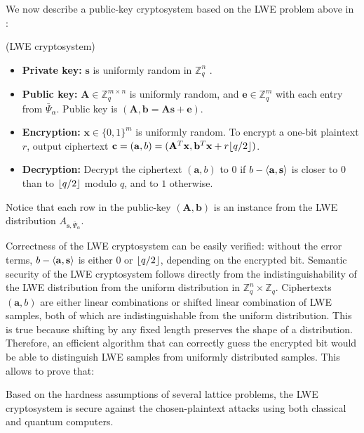 We now describe a public-key cryptosystem based on the LWE problem above in \cite{brakerski2013classical}:
\begin{definition}{(LWE cryptosystem)}
\label{def:LWE_crypto}
\begin{itemize}
\item \textbf{Private key:} $\mathbf{s}$ is uniformly random in $\mathbb{Z}_q^n$ .
\item \textbf{Public key:}  $\mathbf{A}\in \mathbb{Z}_q^{m\times n}$ is uniformly random, and $\mathbf{e}\in \mathbb{Z}_q^m$ with each entry from $\bar{\Psi}_\alpha$. Public key is $(\mathbf{A},\mathbf{b}=\mathbf{A}\mathbf{s}+\mathbf{e})$.
\item \textbf{Encryption:}  $\mathbf{x}\in\{0,1\}^m$ is uniformly random. To encrypt a one-bit plaintext $r$, output ciphertext $\mathbf{c}=(\mathbf{a},b) = (\mathbf{A}^T\mathbf{x},\mathbf{b}^T\mathbf{x}+ r\lfloor q/2\rfloor)$.
\item \textbf{Decryption:} Decrypt the ciphertext $(\mathbf{a},b)$ to $0$ if $b-\langle\mathbf{a},\mathbf{s}\rangle$ is closer to $0$ than to $\lfloor q/2\rfloor$ modulo $q$, and to $1$ otherwise. 
\end{itemize}
\end{definition}
Notice that each row in the public-key $(\mathbf{A},\mathbf{b})$ is an instance from the LWE distribution $A_{\mathbf{s},\bar{\Psi}_\alpha}$.

Correctness of the LWE cryptosystem can be easily verified: without the error terms, $b-\langle\mathbf{a},\mathbf{s}\rangle$ is either $0$ or $\lfloor q/2\rfloor$, depending on the encrypted bit. 
Semantic security of the LWE cryptosystem follows directly from the indistinguishability of the LWE distribution from the uniform distribution in $\mathbb{Z}_q^n\times\mathbb{Z}_q$. 
Ciphertexts $(\mathbf{a},b)$ are either linear combinations or shifted linear combination of LWE samples, both of which are indistinguishable from the uniform distribution. 
This is true because shifting by any fixed length preserves the shape of a distribution.
Therefore, an efficient algorithm that can correctly guess the encrypted bit would be able to distinguish LWE samples from uniformly distributed samples. 
This allows \cite{regev2009lattices} to prove that:
\begin{theorem}
\label{thm:LWE_hardness}
Based on the hardness assumptions of several lattice problems, the LWE cryptosystem is secure against the chosen-plaintext attacks using both classical and quantum computers.
\end{theorem}

